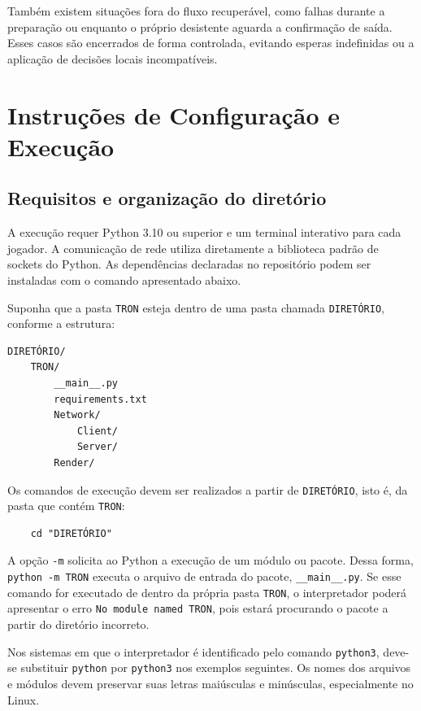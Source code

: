 \documentclass[11pt,a4paper]{article}
\begin{document}
Também existem situações fora do fluxo recuperável, como falhas durante a preparação ou enquanto o próprio desistente aguarda a confirmação de saída. Esses casos são encerrados de forma controlada, evitando esperas indefinidas ou a aplicação de decisões locais incompatíveis.

\section{Instruções de Configuração e Execução}
\label{sec:execucao}

\subsection{Requisitos e organização do diretório}

A execução requer Python 3.10 ou superior e um terminal interativo para cada jogador. A comunicação de rede utiliza diretamente a biblioteca padrão de sockets do Python. As dependências declaradas no repositório podem ser instaladas com o comando apresentado abaixo.

Suponha que a pasta \texttt{TRON} esteja dentro de uma pasta chamada \texttt{DIRETÓRIO}, conforme a estrutura:

\begin{verbatim}
DIRETÓRIO/
    TRON/
        __main__.py
        requirements.txt
        Network/
            Client/
            Server/
        Render/
\end{verbatim}

Os comandos de execução devem ser realizados a partir de \texttt{DIRETÓRIO}, isto é, da pasta que contém \texttt{TRON}:

\begin{verbatim}
	cd "DIRETÓRIO"
\end{verbatim}

A opção \texttt{-m} solicita ao Python a execução de um módulo ou pacote. Dessa forma, \texttt{python -m TRON} executa o arquivo de entrada do pacote, \texttt{\_\_main\_\_.py}. Se esse comando for executado de dentro da própria pasta \texttt{TRON}, o interpretador poderá apresentar o erro \texttt{No module named TRON}, pois estará procurando o pacote a partir do diretório incorreto.

Nos sistemas em que o interpretador é identificado pelo comando \texttt{python3}, deve-se substituir \texttt{python} por \texttt{python3} nos exemplos seguintes. Os nomes dos arquivos e módulos devem preservar suas letras maiúsculas e minúsculas, especialmente no Linux.
\end{document}
